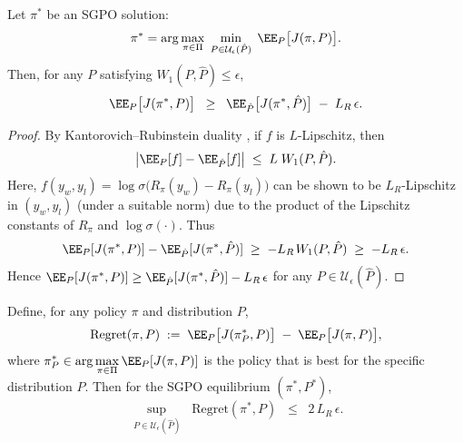 \begin{theorem}
\label{thm:robust_policy}
Let $\pi^*$ be an SGPO solution: 
\[
\pi^*
=
\arg\max_{\pi\in \Pi}\;\min_{P\in \mathcal{U}_\epsilon(\hat{P})}\;
\EE_{P}\bigl[J(\pi,P)\bigr].
\]
Then, for any $P$ satisfying $W_1(P,\hat{P})\le \epsilon$,
\[
\EE_{P}\bigl[J(\pi^*,P)\bigr]
\;\;\ge\;\;
\EE_{\hat{P}}\bigl[J(\pi^*,\hat{P})\bigr]
\;-\; 
L_R\,\epsilon.
\]
\end{theorem}

\begin{proof}
By Kantorovich--Rubinstein duality \cite[\S 5.10]{villani2003topics}, if $f$ is $L$-Lipschitz, then
\[
\bigl|\EE_{P}[f] - \EE_{\hat{P}}[f]\bigr|
\;\le\;
L\;W_1(P,\hat{P}).
\]
Here, $f(y_w,y_l)=\log\sigma\bigl(R_\pi(y_w)-R_\pi(y_l)\bigr)$ can be shown to be $L_R$-Lipschitz in $(y_w,y_l)$ (under a suitable norm) due to the product of the Lipschitz constants of $R_\pi$ and $\log\sigma(\cdot)$.  Thus
\[
\EE_{P}[J(\pi^*,P)]
-
\EE_{\hat{P}}[J(\pi^*,\hat{P})]
\;\ge\;
-L_R\;\!W_1(P,\hat{P})
\;\ge\;
-L_R\,\epsilon.
\]
Hence $\EE_{P}[J(\pi^*,P)]\ge \EE_{\hat{P}}[J(\pi^*,\hat{P})] - L_R\,\epsilon$ for any $P\in \mathcal{U}_\epsilon(\hat{P})$.
\end{proof}

\begin{theorem}\label{thm:SGPO_regret}
Define, for any policy $\pi$ and distribution $P$,
\[
\text{Regret}(\pi,P)
\;:=\;
\EE_{P}\bigl[J(\pi_P^*,P)\bigr]
\;-\;
\EE_{P}\bigl[J(\pi,P)\bigr],
\]
where $\displaystyle \pi_P^*\in \arg\max_{\pi\in \Pi}\EE_{P}[J(\pi,P)]$ is the policy that is best for the specific distribution $P$.  Then for the SGPO equilibrium $(\pi^*,P^*)$,
\[
\sup_{\,P \in \mathcal{U}_\epsilon(\hat{P})}
\;\;
\text{Regret}(\pi^*,P)
\;\;\le\;\; 
2\,L_{R}\,\epsilon.
\]
\end{theorem}

